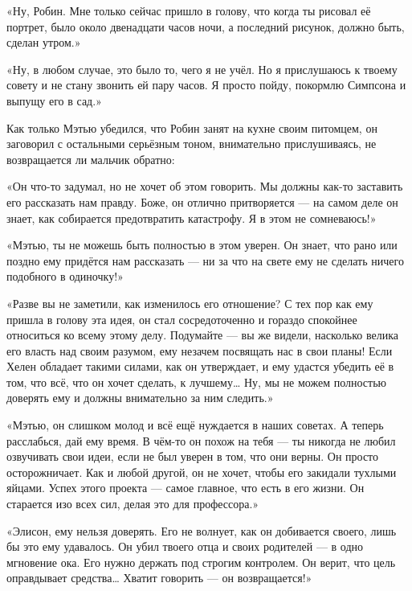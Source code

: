 \documentclass[a4paper,12pt]{book}
\begin{document}
«Ну, Робин. Мне только сейчас пришло в голову, что когда ты рисовал её портрет, было около двенадцати часов ночи, а последний рисунок, должно быть, сделан утром.»
\par
«Ну, в любом случае, это было то, чего я не учёл. Но я прислушаюсь к твоему совету и не стану звонить ей пару часов. Я просто пойду, покормлю Симпсона и выпущу его в сад.»\\
\par	
Как только Мэтью убедился, что Робин занят на кухне своим питомцем, он заговорил с остальными серьёзным тоном, внимательно прислушиваясь, не возвращается ли мальчик обратно:
\par
«Он что-то задумал, но не хочет об этом говорить. Мы должны как-то заставить его рассказать нам правду. Боже, он отлично притворяется — на самом деле он знает, как собирается предотвратить катастрофу. Я в этом не сомневаюсь!»
\par
«Мэтью, ты не можешь быть полностью в этом уверен. Он знает, что рано или поздно ему придётся нам рассказать — ни за что на свете ему не сделать ничего подобного в одиночку!»
\par
«Разве вы не заметили, как изменилось его отношение? С тех пор как ему пришла в голову эта идея, он стал сосредоточенно и гораздо спокойнее относиться ко всему этому делу. Подумайте — вы же видели, насколько велика его власть над своим разумом, ему незачем посвящать нас в свои планы! Если Хелен обладает такими силами, как он утверждает, и ему удастся убедить её в том, что всё, что он хочет сделать, к лучшему… Ну, мы не можем полностью доверять ему и должны внимательно за ним следить.»
\par
«Мэтью, он слишком молод и всё ещё нуждается в наших советах. А теперь расслабься, дай ему время. В чём-то он похож на тебя — ты никогда не любил озвучивать свои идеи, если не был уверен в том, что они верны. Он просто осторожничает. Как и любой другой, он не хочет, чтобы его закидали тухлыми яйцами. Успех этого проекта — самое главное, что есть в его жизни. Он старается изо всех сил, делая это для профессора.»
\par
«Элисон, ему нельзя доверять. Его не волнует, как он добивается своего, лишь бы это ему удавалось. Он убил твоего отца и своих родителей — в одно мгновение ока. Его нужно держать под строгим контролем. Он верит, что цель оправдывает средства… Хватит говорить — он возвращается!»
\end{document}
